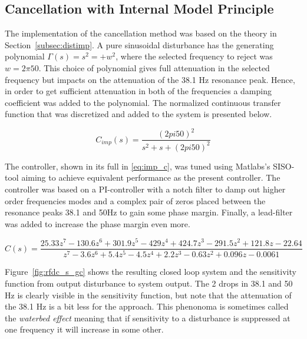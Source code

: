 \FloatBarrier
\subsection{Cancellation with Internal Model Principle}
The implementation of the \abbrIMP cancellation method was based on the theory in Section~\ref{subsec:distimp}. A pure sinusoidal disturbance has the generating polynomial $\Gamma(s) = s^2 = + w^2$, where the selected frequency to reject was  $w = 2\pi50$. This choice of polynomial gives full attenuation in the selected frequency but impacts on the attenuation of the 38.1 Hz resonance peak. Hence, in order to get sufficient attenuation in both of the frequencies a damping coefficient was added to the polynomial. The normalized continuous transfer function that was discretized and added to the system is presented below.

\begin{equation}
  C_{imp}(s) = \frac{(2pi50)^2}{s^2 + s + (2pi50)^2}
\end{equation}

The controller, shown in its full in \eqref{eq:imp_c}, was tuned using Matlabs's SISO-tool aiming to achieve equivalent performance as the present controller. The controller was based on a PI-controller with a notch filter to damp out higher order frequencies modes and a complex pair of zeros placed between the resonance peaks 38.1 and 50Hz to gain some phase margin. Finally, a lead-filter was added to increase the phase margin even more.

\begin{equation}
  \label{eq:imp_c}
  C(s) = \frac{25.33z^7 - 130.6z^6 + 301.9z^5 - 429z^4 + 424.7z^3 - 291.5z^2 + 121.8z - 22.64}{z^7 - 3.6z^6 + 5.4z^5 - 4.5z^4 + 2.2z^3 - 0.63z^2 + 0.096z - 0.0061}
\end{equation}




Figure~\ref{fig:rfdc_s_gc} shows the resulting closed loop system and the sensitivity function from output disturbance to system output. The 2 drops in 38.1 and 50 Hz is clearly visible in the sensitivity function, but note that the attenuation of the 38.1 Hz is a bit less for the \abbrIMP approach. This phenonoma is sometimes called the \emph{waterbed effect} meaning that if sensitivity to a disturbance is suppressed at one frequency it will increase in some other.

